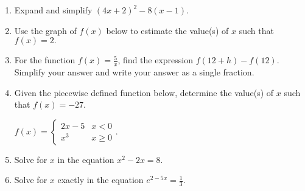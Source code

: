 \documentclass[12pt]{article}
\begin{document}
\begin{enumerate}
\item Expand and simplify $(4x+2)^2-8(x-1).$ \\

\quad \hfill \underline{\hspace{2in}}
\vfill

\item Use the graph of $f(x)$ below to estimate the value(s) of $x$ such that $f(x)=2.$

\quad \hfill \underline{\hspace{2in}}

\item For the function $f(x)=\frac{5}{x}$, find the expression $f(12+h)-f(12).$ Simplify your answer and write your answer as a single fraction.\\


\quad \hfill \underline{\hspace{2in}}
\vfill

\item Given the piecewise defined function below, determine the value(s) of $x$ such that $f(x)=-27.$

$f(x)=\begin{cases} 2x - 5 & x <0 \\ x^3 & x \geq 0 \end{cases}.$\\

\quad \hfill \underline{\hspace{2in}}
\vfill


\item Solve for $x$ in the equation $x^2-2x=8.$

\quad \hfill \underline{\hspace{2in}}
\vfill

\newpage
\item Solve for $x$ exactly in the equation $e^{2-5x}=\frac{1}{3}.$



\end{enumerate}
\end{document}
